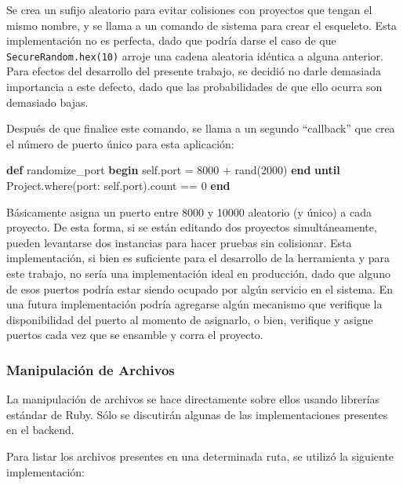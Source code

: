 \documentclass[12pt,spanish,letter]{report}
\newenvironment{Shaded}{}{}
\newcommand{\KeywordTok}[1]{\textcolor[rgb]{0.00,0.44,0.13}{\textbf{{#1}}}}
\newcommand{\DataTypeTok}[1]{\textcolor[rgb]{0.56,0.13,0.00}{{#1}}}
\newcommand{\DecValTok}[1]{\textcolor[rgb]{0.25,0.63,0.44}{{#1}}}
\newcommand{\NormalTok}[1]{{#1}}
\begin{document}
Se crea un sufijo aleatorio para evitar colisiones con proyectos que
tengan el mismo nombre, y se llama a un comando de sistema para crear el
esqueleto. Esta implementación no es perfecta, dado que podría darse el
caso de que \texttt{SecureRandom.hex(10)} arroje una cadena aleatoria
idéntica a alguna anterior. Para efectos del desarrollo del presente
trabajo, se decidió no darle demasiada importancia a este defecto, dado
que las probabilidades de que ello ocurra son demasiado bajas.

Después de que finalice este comando, se llama a un segundo ``callback''
que crea el número de puerto único para esta aplicación:

\begin{Shaded}
\begin{Highlighting}[]
\KeywordTok{def} \NormalTok{randomize_port}
  \KeywordTok{begin}
    \DecValTok{self}\NormalTok{.port = }\DecValTok{8000} \NormalTok{+ rand(}\DecValTok{2000}\NormalTok{)}
  \KeywordTok{end} \KeywordTok{until} \DataTypeTok{Project}\NormalTok{.where(port: }\DecValTok{self}\NormalTok{.port).count == }\DecValTok{0}
\KeywordTok{end}
\end{Highlighting}
\end{Shaded}

Básicamente asigna un puerto entre 8000 y 10000 aleatorio (y único) a
cada proyecto. De esta forma, si se están editando dos proyectos
simultáneamente, pueden levantarse dos instancias para hacer pruebas sin
colisionar. Esta implementación, si bien es suficiente para el
desarrollo de la herramienta y para este trabajo, no sería una
implementación ideal en producción, dado que alguno de esos puertos
podría estar siendo ocupado por algún servicio en el sistema. En una
futura implementación podría agregarse algún mecanismo que verifique la
disponibilidad del puerto al momento de asignarlo, o bien, verifique y
asigne puertos cada vez que se ensamble y corra el proyecto.

\subsubsection{Manipulación de Archivos}

La manipulación de archivos se hace directamente sobre ellos usando
librerías estándar de Ruby. Sólo se discutirán algunas de las
implementaciones presentes en el backend.

Para listar los archivos presentes en una determinada ruta, se utilizó
la siguiente implementación:
\end{document}
